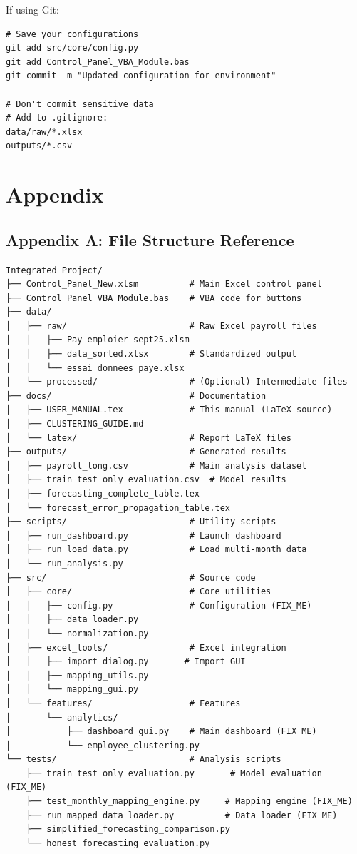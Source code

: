 \documentclass[11pt,a4paper]{article}
\begin{document}
If using Git:
\begin{lstlisting}[style=shellstyle]
# Save your configurations
git add src/core/config.py
git add Control_Panel_VBA_Module.bas
git commit -m "Updated configuration for environment"

# Don't commit sensitive data
# Add to .gitignore:
data/raw/*.xlsx
outputs/*.csv
\end{lstlisting}

\newpage

\section{Appendix}

\subsection{Appendix A: File Structure Reference}

\begin{lstlisting}[style=shellstyle, caption=Complete Project Structure]
Integrated Project/
├── Control_Panel_New.xlsm          # Main Excel control panel
├── Control_Panel_VBA_Module.bas    # VBA code for buttons
├── data/
│   ├── raw/                        # Raw Excel payroll files
│   │   ├── Pay emploier sept25.xlsm
│   │   ├── data_sorted.xlsx        # Standardized output
│   │   └── essai donnees paye.xlsx
│   └── processed/                  # (Optional) Intermediate files
├── docs/                           # Documentation
│   ├── USER_MANUAL.tex             # This manual (LaTeX source)
│   ├── CLUSTERING_GUIDE.md
│   └── latex/                      # Report LaTeX files
├── outputs/                        # Generated results
│   ├── payroll_long.csv            # Main analysis dataset
│   ├── train_test_only_evaluation.csv  # Model results
│   ├── forecasting_complete_table.tex
│   └── forecast_error_propagation_table.tex
├── scripts/                        # Utility scripts
│   ├── run_dashboard.py            # Launch dashboard
│   ├── run_load_data.py            # Load multi-month data
│   └── run_analysis.py
├── src/                            # Source code
│   ├── core/                       # Core utilities
│   │   ├── config.py               # Configuration (FIX_ME)
│   │   ├── data_loader.py
│   │   └── normalization.py
│   ├── excel_tools/                # Excel integration
│   │   ├── import_dialog.py       # Import GUI
│   │   ├── mapping_utils.py
│   │   └── mapping_gui.py
│   └── features/                   # Features
│       └── analytics/
│           ├── dashboard_gui.py    # Main dashboard (FIX_ME)
│           └── employee_clustering.py
└── tests/                          # Analysis scripts
    ├── train_test_only_evaluation.py       # Model evaluation (FIX_ME)
    ├── test_monthly_mapping_engine.py     # Mapping engine (FIX_ME)
    ├── run_mapped_data_loader.py          # Data loader (FIX_ME)
    ├── simplified_forecasting_comparison.py
    └── honest_forecasting_evaluation.py
\end{lstlisting}
\end{document}
